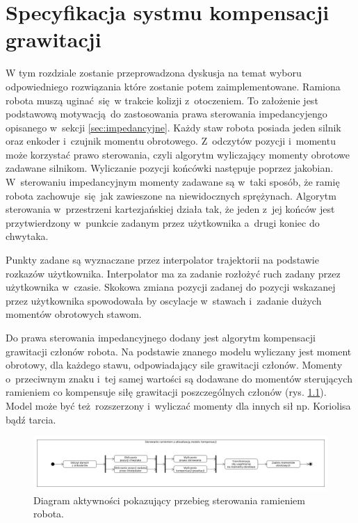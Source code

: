 
\chapter{Specyfikacja systmu kompensacji grawitacji\label{chap:implementacja_systemu}}
W tym rozdziale zostanie przeprowadzona dyskusja na temat wyboru odpowiedniego rozwiązania które zostanie potem zaimplementowane. Ramiona robota muszą uginać się w trakcie kolizji z~otoczeniem. To założenie jest podstawową motywacją do zastosowania prawa sterowania impedancyjengo opisanego w~sekcji \ref{sec:impedancyjne}. Każdy staw robota posiada jeden silnik oraz enkoder i~czujnik momentu obrotowego. Z~odczytów pozycji i~momentu może korzystać prawo sterowania, czyli algorytm wyliczający momenty obrotowe zadawane silnikom. Wyliczanie pozycji końcówki następuje poprzez jakobian. W~sterowaniu impedancyjnym momenty zadawane są w~taki sposób, że ramię robota zachowuje się jak zawieszone na niewidocznych sprężynach. Algorytm sterowania w~przestrzeni kartezjańskiej działa tak, że jeden z~jej końców jest przytwierdzony w~punkcie zadanym przez użytkownika a~drugi koniec do chwytaka. 

Punkty zadane są wyznaczane przez interpolator trajektorii na podstawie rozkazów użytkownika. Interpolator ma za zadanie rozłożyć ruch zadany przez użytkownika w~czasie. Skokowa zmiana pozycji zadanej do pozycji wskazanej przez użytkownika spowodowała by oscylacje w~stawach i~zadanie dużych momentów obrotowych stawom.

Do prawa sterowania impedancyjnego dodany jest algorytm kompensacji grawitacji członów robota. Na podstawie znanego modelu wyliczany jest moment obrotowy, dla każdego stawu, odpowiadający sile grawitacji członów. Momenty o~przeciwnym znaku i~tej samej wartości są dodawane do momentów sterujących ramieniem co kompensuje siłę grawitacji poszczególnych członów (rys. \ref{fig:sterowanie}). Model może być też rozszerzony i~wyliczać momenty dla innych sił np. Koriolisa bądź tarcia.

\begin{figure}
	\centering
	\includegraphics[width=.99\textwidth]{images/kompensacja.png}
	\caption{Diagram aktywności pokazujący przebieg sterowania ramieniem robota.}
	\label{fig:sterowanie}
\end{figure}

